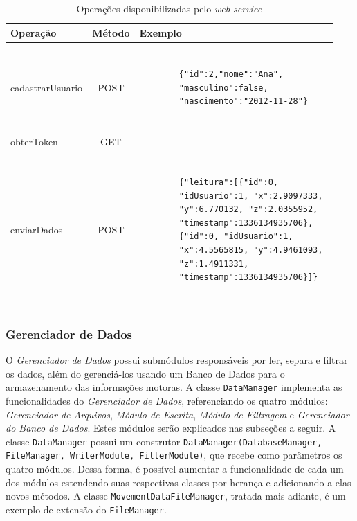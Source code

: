 \begin{table} 
\centering 
\caption{Operações disponibilizadas pelo \textit{web service}}
\begin{center}
    \begin{tabular}{ | l | c | l | }
        \hline
        Operação & Método & Exemplo \\ \hline
        cadastrarUsuario & POST & 
		\begin{minipage}{7cm}\begin{verbatim}
		
		{"id":2,"nome":"Ana",
		"masculino":false,
		"nascimento":"2012-11-28"}
		
		\end{verbatim}\end{minipage} \\ \hline
        obterToken & GET & - \\ \hline
        enviarDados & POST & 
		\begin{minipage}{7.5cm}\begin{verbatim}

		{"leitura":[{"id":0, 
		"idUsuario":1, "x":2.9097333, 
		"y":6.770132, "z":2.0355952, 
		"timestamp":1336134935706}, 
		{"id":0, "idUsuario":1, 
		"x":4.5565815, "y":4.9461093, 
		"z":1.4911331, 
		"timestamp":1336134935706}]}
		
		\end{verbatim}\end{minipage} \\ \hline
    \end{tabular}
\end{center}
\label{tab:operations}
\end{table}

\subsubsection{Gerenciador de Dados}
O \emph{Gerenciador de Dados} possui submódulos responsáveis por ler, separa e filtrar os dados, além do gerenciá-los usando um Banco de Dados para o armazenamento das informações motoras. A classe \texttt{DataManager} implementa as funcionalidades do \emph{Gerenciador de Dados}, referenciando os quatro módulos: \emph{Gerenciador de Arquivos}, \emph{Módulo de Escrita}, \emph{Módulo de Filtragem} e \emph{Gerenciador do Banco de Dados}. Estes módulos serão explicados nas subseções a seguir. A classe \texttt{DataManager} possui um construtor \texttt{DataManager(DatabaseManager, FileManager, WriterModule, FilterModule)}, que recebe como parâmetros os quatro módulos. Dessa forma, é possível aumentar a funcionalidade de cada um dos módulos estendendo suas respectivas classes por herança e adicionando a elas novos métodos. A classe \texttt{MovementDataFileManager}, tratada mais adiante, é um exemplo de extensão do \texttt{FileManager}.

